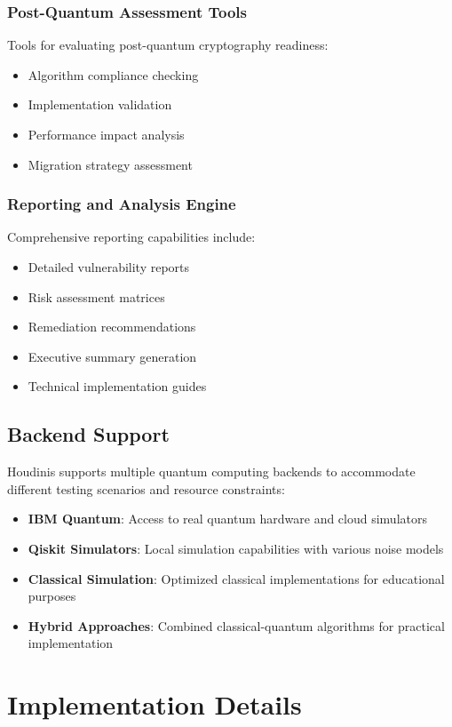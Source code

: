 \documentclass[11pt]{article}
\begin{document}
\subsubsection{Post-Quantum Assessment Tools}
Tools for evaluating post-quantum cryptography readiness:
\begin{itemize}
\item Algorithm compliance checking
\item Implementation validation
\item Performance impact analysis
\item Migration strategy assessment
\end{itemize}

\subsubsection{Reporting and Analysis Engine}
Comprehensive reporting capabilities include:
\begin{itemize}
\item Detailed vulnerability reports
\item Risk assessment matrices
\item Remediation recommendations
\item Executive summary generation
\item Technical implementation guides
\end{itemize}

\subsection{Backend Support}

Houdinis supports multiple quantum computing backends to accommodate different testing scenarios and resource constraints:

\begin{itemize}
\item \textbf{IBM Quantum}: Access to real quantum hardware and cloud simulators
\item \textbf{Qiskit Simulators}: Local simulation capabilities with various noise models
\item \textbf{Classical Simulation}: Optimized classical implementations for educational purposes
\item \textbf{Hybrid Approaches}: Combined classical-quantum algorithms for practical implementation
\end{itemize}

\section{Implementation Details}
\end{document}
